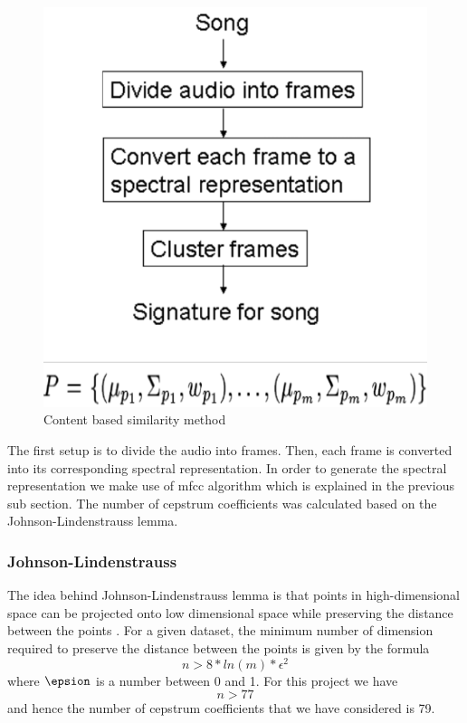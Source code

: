 \documentclass[12pt]{article}
\begin{document}
\begin{figure}[h]\label{content}
\center
\includegraphics{fig1.png}
\caption{Content based similarity method}
\end{figure}

The first setup is to divide the audio into frames. Then, each frame is converted into its corresponding spectral representation. In order to generate the spectral representation we make use of mfcc algorithm which is explained in the previous sub section. The number of cepstrum coefficients was calculated based on the Johnson-Lindenstrauss lemma.

\subsubsection{Johnson-Lindenstrauss}
The idea behind Johnson-Lindenstrauss lemma is that points in high-dimensional space can be projected onto low dimensional space while preserving the distance between the points \cite{dasgupta}. For a given dataset, the minimum number of dimension required to preserve the distance between the points is given by the formula $$ n > 8 * ln(m) * \epsilon ^ 2 $$ where $\epsion$ is a number between 0 and 1. For this project we have $$ n > 77$$ and hence the number of cepstrum coefficients that we have considered is 79.
\end{document}
